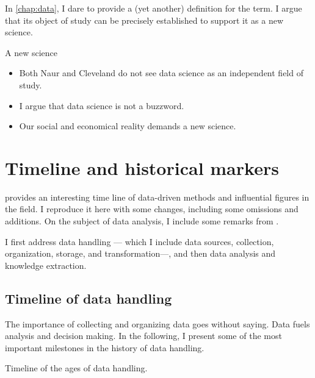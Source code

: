 In \cref{chap:data}, I dare to provide a (yet another) definition for the term.  I
argue that its object of study can be precisely established to support it as a new
science.

\begin{slidebox}{A new science}{}
  \begin{itemize}
    \item Both Naur and Cleveland do not see data science as an independent field of study.
    \item I argue that data science is not a buzzword.
    \item Our social and economical reality demands a new science.
  \end{itemize}
\end{slidebox}

\section{Timeline and historical markers}

\textcite{Kelleher2018} provides an interesting time line of data-driven methods and
influential figures in the field.  I reproduce it here with some changes, including
some omissions and additions.  On the subject of data analysis, I include some remarks
from \textcite{Vapnik1999b}.

I first address data handling --- which I include data sources, collection, organization,
storage, and transformation---, and then data analysis and knowledge extraction.

\subsection{Timeline of data handling}

The importance of collecting and organizing data goes without saying.  Data fuels analysis and
decision making.  In the following, I present some of the most important milestones in the history
of data handling.

\begin{figurebox}[label=fig:data-handling-history]{Timeline of the ages of data handling.}
  \centering
\end{figurebox}

